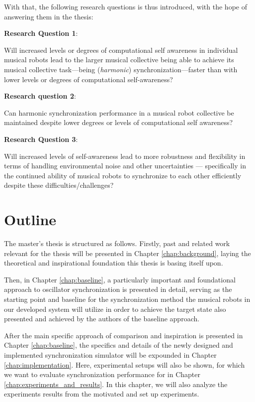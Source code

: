 With that, the following research questions is thus introduced, with the hope of answering them in the thesis: \nl

\textbf{Research Question 1}:

Will increased levels or degrees of computational self awareness in individual musical robots lead to the larger musical collective being able to achieve its musical collective task—being (\textit{harmonic}) synchronization—faster than with lower levels or degrees of computational self-awareness? \nl

\textbf{Research question 2}:

Can harmonic synchronization performance in a musical robot collective be maintained despite lower degrees or levels of computational self awareness? \nl

\textbf{Research Question 3}:

Will increased levels of self-awareness lead to more robustness and flexibility in terms of handling environmental noise and other uncertainties — specifically in the continued ability of musical robots to synchronize to each other efficiently despite these difficulties/challenges? \nl




\section{Outline}

The master's thesis is structured as follows. Firstly, past and related work relevant for the thesis will be presented in Chapter \ref{chap:background}, laying the theoretical and inspirational foundation this thesis is basing itself upon.

Then, in Chapter \ref{chap:baseline}, a particularly important and foundational approach to oscillator synchronization is presented in detail, serving as the starting point and baseline for the synchronization method the musical robots in our developed system will utilize in order to achieve the target state also presented and achieved by the authors of the baseline approach.

After the main specific approach of comparison and inspiration is presented in Chapter \ref{chap:baseline}, the specifics and details of the newly designed and implemented synchronization simulator will be expounded in Chapter \ref{chap:implementation}. Here, experimental setups will also be shown, for which we want to evaluate synchronization performance for in Chapter \ref{chap:experiments_and_results}. In this chapter, we will also analyze the experiments results from the motivated and set up experiments.

